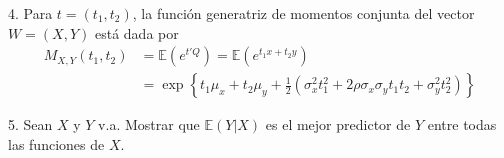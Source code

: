 \documentclass[11pt,letterpaper]{article}
\newcommand{\mE}{\mathbb{E}}
\begin{document}
4. Para $t=(t_1, t_2)$, la función generatriz de momentos conjunta del vector $W=(X,Y)$ está dada por 
\begin{align*}
M_{X,Y}(t_1, t_2)&= \mE(e^{t'Q})=\mE(e^{t_1x+t_2y})\\
&=\exp\left\{t_1\mu_x+t_2\mu_y+\frac{1}{2}(\sigma_x^2t_1^2+2\rho \sigma_x\sigma_y t_1t_2+\sigma_y^2t_2^2)\right\}
\end{align*}

5. Sean $X$ y $Y$ v.a. Mostrar que $\mE(Y|X)$ es el mejor predictor de $Y$ entre todas las funciones de $X$.
\end{document}
